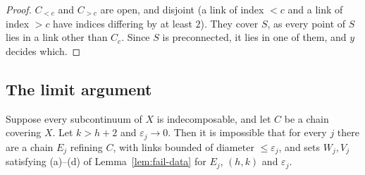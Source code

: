 \begin{proof}
$C_{<c}$ and $C_{>c}$ are open, and disjoint (a link of index $<c$ and a link of index $>c$ have indices differing by at least $2$). They
cover $S$, as every point of $S$ lies in a link other than $C_c$. Since $S$ is preconnected, it lies in one of them, and $y$ decides which.
\end{proof}


\subsection{The limit argument}

\begin{proposition}\label{prop:limit-false}
Suppose every subcontinuum of $X$ is indecomposable, and let $C$ be a chain covering $X$. Let $k>h+2$ and $\varepsilon_j\to0$. Then it is
impossible that for every $j$ there are a chain $E_j$ refining $C$, with links bounded of diameter $\le\varepsilon_j$, and sets $W_j,V_j$
satisfying (a)--(d) of Lemma~\ref{lem:fail-data} for $E_j$, $(h,k)$ and $\varepsilon_j$.
\end{proposition}

